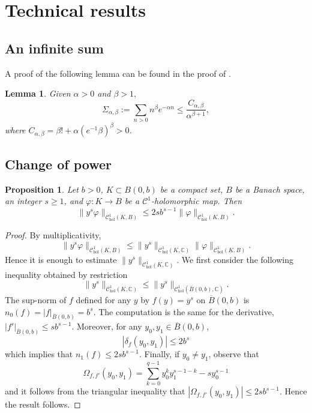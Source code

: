 \documentclass[10pt]{article}
\newtheorem{lemma}[theorem]{Lemma}
\newtheorem{proposition}[theorem]{Proposition}
\newcommand{\CC}{\mathbb{C}}
\begin{document}
\section{Technical results}

\subsection{An infinite sum}

A proof of the following lemma can be found in the proof of \cite[Proposition 12]{CMS}.
\begin{lemma}
\label{lemma:classical_sum}
Given $\alpha > 0$ and $\beta > 1,$
$$\Sigma_{\alpha, \beta} := \sum_{n>0}n^\beta e^{-\alpha n} \leq \frac{C_{\alpha,\beta}}{\alpha ^{\beta+1}},$$
where $C_{\alpha,\beta} = \beta!+\alpha(e^{-1}\beta)^\beta>0$.
\end{lemma}


\subsection{Change of power}

\begin{proposition}
\label{proposition:norm_power_times_map}
Let $b>0$, $K\subset B(0,b)$ be a compact set, $B$ be a Banach space, an integer $s\geq 1$, and $\varphi:K\to B$ be a $\mathscr C^1$-holomorphic map. Then
$$\|y^s\varphi\|_{\mathscr C^1_{\text{hol}}(K,B)}\leq 2sb^{s-1}\|\varphi\|_{\mathscr C^1_{\text{hol}}(K,B)}.$$
\end{proposition}

\begin{proof}
 By multiplicativity, 
 \[
 \|y^s\varphi\|_{\mathscr C^1_{\text{hol}}(K,B)}\leq \|y^s\|_{\mathscr C^1_{\text{hol}}(K,\CC)}\|\varphi\|_{\mathscr C^1_{\text{hol}}(K,B)}.
 \]
 Hence it is enough to estimate $\|y^s\|_{\mathscr C^1_{\text{hol}}(K,\CC)}$. We first consider the following inequality obtained by restriction
 \[
 \|y^s\|_{\mathscr C^1_{\text{hol}}(K,\CC)} \leq \|y^s\|_{\mathscr C^1_{\text{hol}}(\overline B(0,b),\CC)}.
 \]
 The sup-norm of $f$ defined for any $y$ by $f(y) = y^s$ on $\overline B(0,b)$ is $n_0(f)=|f|_{\overline B(0,b)} = b^s$. The computation is the same for the derivative, $|f'|_{\overline B(0,b)}\leq sb^{s-1}$. Moreover, for any $y_0,y_1\in\overline{B}(0,b)$,
 \[
 |\delta_f(y_0,y_1)|\leq 2b^{s}
 \]
 which implies that $n_1(f)\leq 2sb^{s-1}$. Finally, if $y_0\neq y_1$, observe that 
 \[
 \Omega_{f,f'}(y_0,y_1) = \sum_{k=0}^{q-1}y_0^ky_1^{s-1-k}-sy_0^{s-1}
 \]
 and it follows from the triangular inequality that $|\Omega_{f,f'}(y_0,y_1)|\leq 2sb^{s-1}$. Hence the result follows.
\end{proof}
\end{document}
